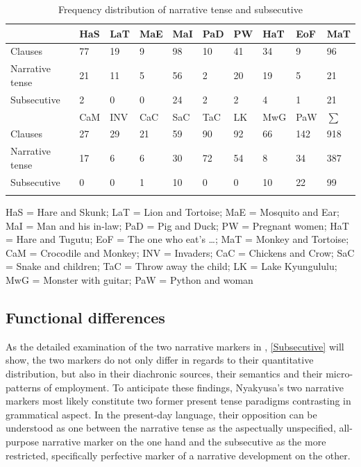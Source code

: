 \begin{table}%
\begin{center}
\begin{tabularx}{\textwidth}{lXXXXXXXXX}
\lsptoprule
& HaS & LaT & MaE & MaI & PaD & PW & HaT & EoF & MaT\\ \midrule
\footnotesize{Clauses} & 77 & 19 & 9 & 98 & 10 & 41 & 34 & 9 & 96 \\
\footnotesize{Narrative tense} & 21 & 11 & 5 & 56 & 2 & 20 & 19 & 5 & 21 \\
\footnotesize{Subsecutive} & 2 & 0 & 0 & 24 & 2 & 2 &4 & 1 & 21 \\
\midrule
& CaM & INV & CaC &  SaC & TaC & LK & MwG & PaW & $\sum$\\ \midrule
\footnotesize{Clauses} & 27 & 29 & 21 & 59 & 90 & 92 & 66 & 142 & 918\\
\footnotesize{Narrative tense} & 17 & 6 & 6 & 30 & 72 & 54 & 8 & 34 & 387\\
\footnotesize{Subsecutive} & 0 & 0 & 1 & 10 & 0 & 0 & 10 & 22 & 99\\
\lspbottomrule
\end{tabularx}
\caption{Frequency distribution of narrative tense and subsecutive}\label{TableFrequencyNARRandSUBSEC}
\end{center}
\small{HaS = Hare and Skunk; LaT = Lion and Tortoise; MaE = Mosquito and Ear; MaI = Man and his in-law; PaD = Pig and Duck; PW = Pregnant women; HaT = Hare and Tugutu; EoF = The one who eat's \ldots; MaT = Monkey and Tortoise; CaM = Crocodile and Monkey; INV = Invaders; CaC = Chickens and Crow; SaC = Snake and children; TaC = Throw away the child; LK = Lake Kyungululu; MwG = Monster with guitar; PaW = Python and woman}
\end{table}


\subsection{Functional differences} \label{NarrativeMarkersFunctionalDifferences}
As the detailed examination of the two narrative markers in , \ref{Subsecutive} will show, the two markers do not only differ in regards to their quantitative distribution, but also in their diachronic sources, their semantics and their micro-patterns of employment. To anticipate these findings, Nyakyusa's two narrative markers most likely constitute two former present tense paradigms contrasting in grammatical aspect. In the present-day language, their opposition can be understood as one between the narrative tense as the aspectually unspecified, all-purpose narrative marker on the one hand and the subsecutive as the more restricted, specifically perfective marker of a narrative development on the other.
